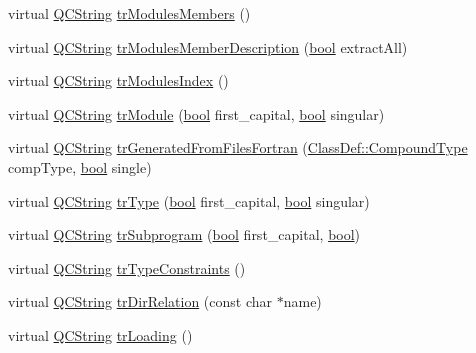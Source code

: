 \begin{DoxyCompactItemize}
\item 
virtual \hyperlink{class_q_c_string}{Q\+C\+String} \hyperlink{class_translator_swedish_ac558b9172dae70014081872abeb0424a}{tr\+Modules\+Members} ()
\item 
virtual \hyperlink{class_q_c_string}{Q\+C\+String} \hyperlink{class_translator_swedish_aa85dc0feb681133b4592cad3c90720b9}{tr\+Modules\+Member\+Description} (\hyperlink{qglobal_8h_a1062901a7428fdd9c7f180f5e01ea056}{bool} extract\+All)
\item 
virtual \hyperlink{class_q_c_string}{Q\+C\+String} \hyperlink{class_translator_swedish_ad3c96e98310c6d8988a61fa7b37ad440}{tr\+Modules\+Index} ()
\item 
virtual \hyperlink{class_q_c_string}{Q\+C\+String} \hyperlink{class_translator_swedish_a081eed26a5fb7b222d6359c37cb02543}{tr\+Module} (\hyperlink{qglobal_8h_a1062901a7428fdd9c7f180f5e01ea056}{bool} first\+\_\+capital, \hyperlink{qglobal_8h_a1062901a7428fdd9c7f180f5e01ea056}{bool} singular)
\item 
virtual \hyperlink{class_q_c_string}{Q\+C\+String} \hyperlink{class_translator_swedish_a634e31e70dca60b2d9118c57b484eb2f}{tr\+Generated\+From\+Files\+Fortran} (\hyperlink{class_class_def_ae70cf86d35fe954a94c566fbcfc87939}{Class\+Def\+::\+Compound\+Type} comp\+Type, \hyperlink{qglobal_8h_a1062901a7428fdd9c7f180f5e01ea056}{bool} single)
\item 
virtual \hyperlink{class_q_c_string}{Q\+C\+String} \hyperlink{class_translator_swedish_a10a94a1f1452e7cff378ae2471f1671d}{tr\+Type} (\hyperlink{qglobal_8h_a1062901a7428fdd9c7f180f5e01ea056}{bool} first\+\_\+capital, \hyperlink{qglobal_8h_a1062901a7428fdd9c7f180f5e01ea056}{bool} singular)
\item 
virtual \hyperlink{class_q_c_string}{Q\+C\+String} \hyperlink{class_translator_swedish_a1dccde975433a816c2fc9230312b13b0}{tr\+Subprogram} (\hyperlink{qglobal_8h_a1062901a7428fdd9c7f180f5e01ea056}{bool} first\+\_\+capital, \hyperlink{qglobal_8h_a1062901a7428fdd9c7f180f5e01ea056}{bool})
\item 
virtual \hyperlink{class_q_c_string}{Q\+C\+String} \hyperlink{class_translator_swedish_acd899397b02f8a3dd1125dcaa8966a1d}{tr\+Type\+Constraints} ()
\item 
virtual \hyperlink{class_q_c_string}{Q\+C\+String} \hyperlink{class_translator_swedish_ae13fe80fbee2ae648049076e42a12039}{tr\+Dir\+Relation} (const char $\ast$name)
\item 
virtual \hyperlink{class_q_c_string}{Q\+C\+String} \hyperlink{class_translator_swedish_a4e0e917690d93ba161c201402eb7d4c7}{tr\+Loading} ()

\end{DoxyCompactItemize}
